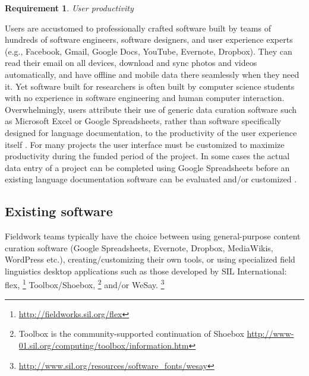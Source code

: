 \documentclass[11pt]{article}
\newcommand{\smalltodo}[2][]
    {\todo[caption={#2}, #1]
    {\tiny#2\normalsize}}
\newtheorem{requirement}{Requirement}
\begin{document}



\begin{requirement}
	\label{req:productivity}
       User productivity
\end{requirement}

Users are accustomed to professionally crafted software built by teams
of hundreds of software engineers, software designers, and user experience
experts (e.g., Facebook, Gmail, Google Docs, YouTube, Evernote, Dropbox). They
can read their email on all devices, download and sync photos and videos
automatically, and have offline and mobile data there seamlessly when they need
it. Yet software built for researchers is often built by computer science
students with no experience in software engineering and human computer
interaction. Overwhelmingly, users attribute their use of generic
data curation software such as Microsoft Excel or Google Spreadsheets, rather
than software specifically designed for language documentation, to the
productivity of the user experience itself  \cite{lingsync:2012}. For many
projects the user interface must be customized to maximize productivity during
the funded period of the project. In some cases the actual data entry of
a project can be completed using Google Spreadsheets before an existing language
documentation software can be evaluated and/or customized \cite{Troy:2014}.



\subsection{Existing software}
\label{sec:existing-software}

Fieldwork teams typically have the choice between using general-purpose content
curation software (Google Spreadsheets, Evernote, Dropbox, MediaWikis,
WordPress etc.), creating/customizing their own tools, or using specialized
field linguistics desktop applications such as those developed by SIL
International: \gls{flex},%
\footnote{ \url{http://fieldworks.sil.org/flex} } %
 Toolbox/Shoebox,%
\footnote{Toolbox is the community-supported continuation of Shoebox \url{http://www-01.sil.org/computing/toolbox/information.htm}} %
and/or WeSay.%
\footnote{\url{http://www.sil.org/resources/software\_fonts/wesay}}
\end{document}
